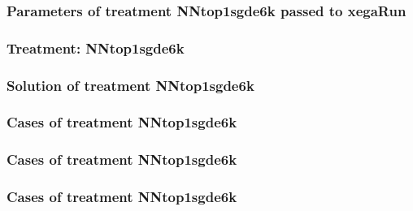 \documentclass[18pt,c]{beamer}
\begin{document}

 \begin{frame}
 \fontsize{8pt}{9pt}\selectfont
 \frametitle{  Parameters of treatment NNtop1sgde6k passed to xegaRun
 }

 \label{ExpDtParmTable029.tex}  
 \end{frame}

 \begin{frame}
 \fontsize{8pt}{9pt}\selectfont
 \frametitle{ Treatment: NNtop1sgde6k }

 \label{ExpDStatsTable012.tex}  
 \end{frame}

 \begin{frame}
 \fontsize{8pt}{9pt}\selectfont
 \frametitle{ Solution of treatment NNtop1sgde6k }

 \label{ExpDSolutionTable028.tex}  
 \end{frame}

 \begin{frame}
 \fontsize{8pt}{9pt}\selectfont
 \frametitle{ Cases of treatment NNtop1sgde6k }

 \label{ExpDSolutionTable029.tex}  
 \end{frame}

 \begin{frame}
 \fontsize{8pt}{9pt}\selectfont
 \frametitle{ Cases of treatment NNtop1sgde6k }

 \label{ExpDSolutionTable030.tex}  
 \end{frame}

 \begin{frame}
 \fontsize{8pt}{9pt}\selectfont
 \frametitle{ Cases of treatment NNtop1sgde6k }

 \label{ExpDSolutionTable031.tex}  
 \end{frame}
\end{document}
